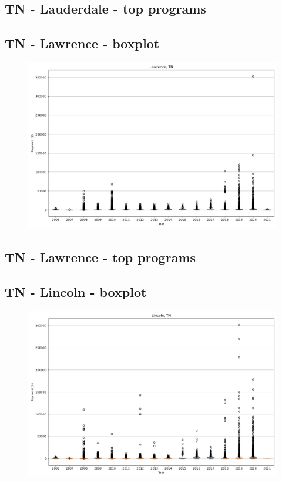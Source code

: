 \subsection*{TN - Lauderdale - top programs}

\newpage
\subsection*{TN - Lawrence - boxplot}
\begin{figure}[h]
\centering
\includegraphics[width=7in]{../output/boxplots/counties/Lawrence-TN_boxplot.png}
\end{figure}


\subsection*{TN - Lawrence - top programs}

\newpage
\subsection*{TN - Lincoln - boxplot}
\begin{figure}[h]
\centering
\includegraphics[width=7in]{../output/boxplots/counties/Lincoln-TN_boxplot.png}
\end{figure}


